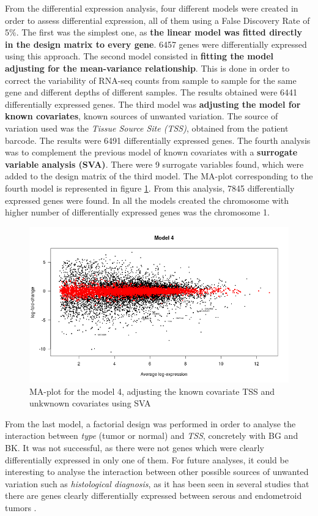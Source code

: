 \documentclass[9pt,twocolumn,twoside]{gsajnl}
\begin{document}
From the differential expression analysis, four different models were created in order to assess differential expression, all of them using a False Discovery Rate of 5\%. The first was the simplest one, as \textbf{the linear model was fitted directly in the design matrix to every gene}. 6457 genes were differentially expressed using this approach. The second model consisted in \textbf{fitting the model adjusting for the mean-variance relationship}. This is done in order to correct the variability of RNA-seq counts from sample to sample for the same gene and different depths of different samples. The results obtained were 6441 differentially expressed genes. The third model was \textbf{adjusting the model for known covariates}, known sources of unwanted variation. The source of variation used was the \textit{Tissue Source Site (TSS)}, obtained from the patient barcode. The results were 6491 differentially expressed genes. The fourth analysis was to complement the previous model of known covariates with a \textbf{surrogate variable analysis (SVA)}. There were 9 surrogate variables found, which were added to the design matrix of the third model. The MA-plot corresponding to the fourth model is represented in figure \ref{fig:MAplot}.  From this analysis, 7845 differentially expressed genes were found. In all the models created the chromosome with higher number of differentially expressed genes was the chromosome 1.

\begin{figure}[htbp]
\centering
\includegraphics[width=\linewidth]{maPlot-1}
\caption{MA-plot for the model 4, adjusting the known covariate TSS and unkwnown covariates using SVA}
\label{fig:MAplot}
\end{figure}

From the last model, a factorial design was performed in order to analyse the interaction between \textit{type} (tumor or normal) and \textit{TSS}, concretely with BG and BK. It was not successful, as there were not genes which were clearly differentially expressed in only one 	of them. For future analyses, it could be interesting to analyse the interaction between other possible sources of unwanted variation such as \textit{histological diagnosis}, as it has been seen in several studies that there are genes clearly differentially expressed between serous and endometroid tumors \citep{Getz2013}.
\end{document}
